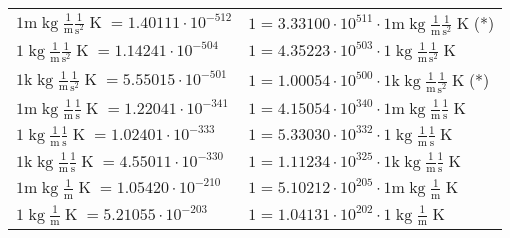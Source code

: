 \begin{center}
\begin{longtable}{l l}
{\color{gray}$1 \bm{\mathrm{ m}}\operatorname{kg}\frac1{\operatorname{m}}\frac1{\operatorname{s}^2}{}{\operatorname{K}} = 1.40111\cdot10^{-512} $}   & {\color{gray}$ 1 = 3.33100\cdot10^{511} \cdot 1 \bm{\mathrm{ m}}\operatorname{kg}\frac1{\operatorname{m}}\frac1{\operatorname{s}^2}{}{\operatorname{K}}$}\quad(*)\\
{\color{black}$1 \bm{\mathrm{ }}\operatorname{kg}\frac1{\operatorname{m}}\frac1{\operatorname{s}^2}{}{\operatorname{K}} = 1.14241\cdot10^{-504} $}   & {\color{black}$ 1 = 4.35223\cdot10^{503} \cdot 1 \bm{\mathrm{ }}\operatorname{kg}\frac1{\operatorname{m}}\frac1{\operatorname{s}^2}{}{\operatorname{K}}$}  \\
{\color{gray}$1 \bm{\mathrm{ k}}\operatorname{kg}\frac1{\operatorname{m}}\frac1{\operatorname{s}^2}{}{\operatorname{K}} = 5.55015\cdot10^{-501} $}   & {\color{gray}$ 1 = 1.00054\cdot10^{500} \cdot 1 \bm{\mathrm{ k}}\operatorname{kg}\frac1{\operatorname{m}}\frac1{\operatorname{s}^2}{}{\operatorname{K}}$}\quad(*)\\
{\color{gray}$1 \bm{\mathrm{ m}}\operatorname{kg}\frac1{\operatorname{m}}\frac1{\operatorname{s}}{}{\operatorname{K}} = 1.22041\cdot10^{-341} $}   & {\color{gray}$ 1 = 4.15054\cdot10^{340} \cdot 1 \bm{\mathrm{ m}}\operatorname{kg}\frac1{\operatorname{m}}\frac1{\operatorname{s}}{}{\operatorname{K}}$}  \\
{\color{black}$1 \bm{\mathrm{ }}\operatorname{kg}\frac1{\operatorname{m}}\frac1{\operatorname{s}}{}{\operatorname{K}} = 1.02401\cdot10^{-333} $}   & {\color{black}$ 1 = 5.33030\cdot10^{332} \cdot 1 \bm{\mathrm{ }}\operatorname{kg}\frac1{\operatorname{m}}\frac1{\operatorname{s}}{}{\operatorname{K}}$}  \\
{\color{gray}$1 \bm{\mathrm{ k}}\operatorname{kg}\frac1{\operatorname{m}}\frac1{\operatorname{s}}{}{\operatorname{K}} = 4.55011\cdot10^{-330} $}   & {\color{gray}$ 1 = 1.11234\cdot10^{325} \cdot 1 \bm{\mathrm{ k}}\operatorname{kg}\frac1{\operatorname{m}}\frac1{\operatorname{s}}{}{\operatorname{K}}$}  \\
{\color{gray}$1 \bm{\mathrm{ m}}\operatorname{kg}\frac1{\operatorname{m}}{}{}{\operatorname{K}} = 1.05420\cdot10^{-210} $}   & {\color{gray}$ 1 = 5.10212\cdot10^{205} \cdot 1 \bm{\mathrm{ m}}\operatorname{kg}\frac1{\operatorname{m}}{}{}{\operatorname{K}}$}  \\
{\color{black}$1 \bm{\mathrm{ }}\operatorname{kg}\frac1{\operatorname{m}}{}{}{\operatorname{K}} = 5.21055\cdot10^{-203} $}   & {\color{black}$ 1 = 1.04131\cdot10^{202} \cdot 1 \bm{\mathrm{ }}\operatorname{kg}\frac1{\operatorname{m}}{}{}{\operatorname{K}}$}  \\

\end{longtable}
\end{center}
